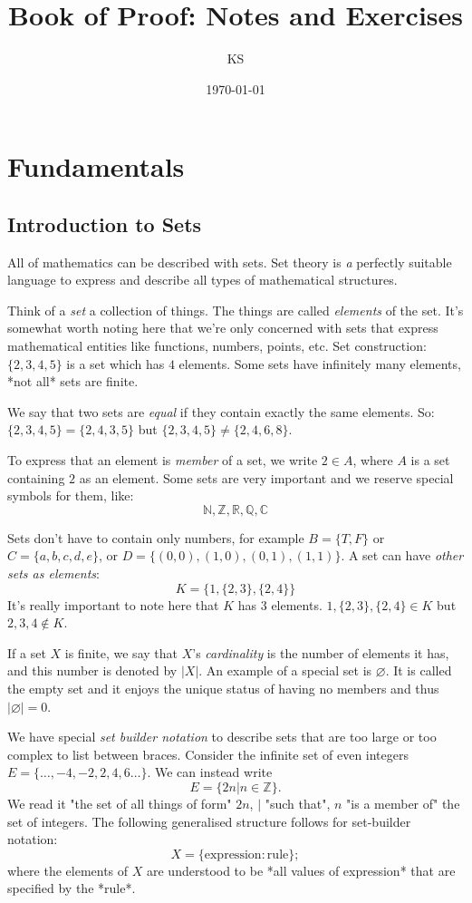 \documentclass{article}
\title{Book of Proof: Notes and Exercises}
\author{KS}
\date{\today}
\theoremstyle{definition}
\begin{document}
\maketitle
\tableofcontents
\clearpage

\section{Fundamentals}
\subsection{Introduction to Sets}

All of mathematics can be described with sets. Set theory is \emph{a} perfectly suitable language to express and describe all types of mathematical structures. 

Think of a \emph{set} a collection of things. The things are called \emph{elements} of the set. It's somewhat worth noting here that we're only concerned with sets that express mathematical entities like functions, numbers, points, etc.
Set construction: $\{ 2, 3, 4, 5 \}$ is a set which has $4$ elements. Some sets have infinitely many elements, *not all* sets are finite.

We say that two sets are \emph{equal} if they contain exactly the same elements. So: 
	$\{ 2,3,4,5 \}=\{ 2, 4,3,5 \}$ but $\{ 2,3,4,5 \}\neq\{ 2,4,6,8 \}$. 

To express that an element is \emph{member} of a set, we write $2\in A$, where $A$ is a set containing $2$ as an element. 
Some sets are very important and we reserve special symbols for them, like: 
$$
\mathbb{N,Z,R,Q,C}
$$  

Sets don't have to contain only numbers, for example $B=\{ T,F \}$ or $C=\{ a,b,c,d,e \}$, or $D=\{ (0,0), (1,0), (0,1), (1,1) \}$. A set can have \emph{other sets as elements}: 
$$
K=\{1, \{ 2,3 \}, \{ 2,4 \}  \}
$$
It's really important to note here that $K$ has $3$ elements. $1, \{ 2, 3 \}, \{ 2,4 \} \in K$ but $2, 3,4 \notin K$.

If a set $X$ is finite, we say that $X$'s \emph{cardinality} is the number of elements it has, and this number is denoted by $|X|$. 
An example of a special set is $\varnothing$. It is called the empty set and it enjoys the unique status of having no members and thus $|\varnothing|=0$. 

We have special \emph{set builder notation} to describe sets that are too large or too complex to list between braces. Consider the infinite set of even integers $E=\{ \dots,-4,-2,2,4,6 \dots \}$. We can instead write 
$$
E=\{ 2n|n\in\mathbb{Z} \}.
$$
We read it "the set of all things of form" $2n$, $|$ "such that", $n$ "is a member of" the set of integers. 
The following generalised structure follows for set-builder notation: 
$$X=\{ \mathrm{expression}: \mathrm{rule} \};$$
where the elements of $X$ are understood to be *all values of expression* that are specified by the *rule*. 
\end{document}
